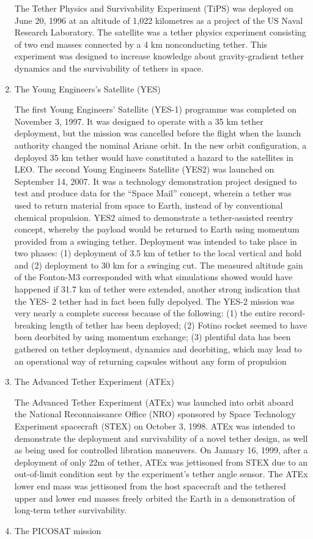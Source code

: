 \begin{enumerate}
The Tether Physics and Survivability Experiment (TiPS) was deployed on June 20, 1996 at an altitude of 1,022 kilometres as a project of the US Naval Research Laboratory. The satellite was a tether physics experiment consisting of two end masses connected by a 4 km nonconducting tether. This experiment was designed to increase knowledge about gravity-gradient tether dynamics and the survivability of tethers in space.

\item{The Young Engineers's Satellite (YES)}

The first Young Engineers’ Satellite (YES-1) programme was completed on November 3, 1997. It was designed to operate with a 35 km tether deployment, but the mission was cancelled before the flight when the launch authority changed the nominal Ariane orbit. In the new orbit configuration, a deployed 35 km tether would have constituted a hazard to the satellites in LEO.
The second Young Engineers Satellite (YES2) was launched on September 14, 2007. It was a technology demonstration project designed to test and produce data for the “Space Mail” concept, wherein a tether was used to return material from space to Earth, instead of by conventional chemical
propulsion. YES2 aimed to demonstrate a tether-assisted reentry concept, whereby the payload would be returned to Earth using momentum provided from a swinging tether. Deployment was intended to take place in two phases: (1) deployment of 3.5 km of tether to the local vertical and hold and (2) deployment to 30 km for a swinging cut. The measured altitude gain of the Fonton-M3 corresponded with what simulations showed would have happened if 31.7 km of tether were extended, another strong indication that the YES- 2 tether had in fact been fully depolyed.
The YES-2 mission was very nearly a complete success because of the following: (1) the entire record-breaking length of tether has been deployed; (2) Fotino rocket seemed to have been deorbited by using momentum exchange; (3) plentiful data has been gathered on tether deployment, dynamics and deorbiting, which may lead to an operational way of returning capsules without any form of propulsion

\item{The Advanced Tether Experiment (ATEx)}

The Advanced Tether Experiment (ATEx) was launched into orbit aboard the National Reconnaissance Office (NRO) sponsored by Space Technology Experiment spacecraft (STEX) on October 3, 1998. ATEx was intended to demonstrate the deployment and survivability of a novel tether design, as well as being used for controlled libration maneuvers. On January 16, 1999, after a deployment of only 22m of tether, ATEx was jettisoned from STEX due to an out-of-limit condition sent by the experiment’s tether angle sensor. The ATEx lower end mass was jettisoned from the host spacecraft and the tethered upper and lower end masses freely orbited the Earth in a demonstration of long-term tether survivability. 
\item{The PICOSAT mission}


\end{enumerate}

